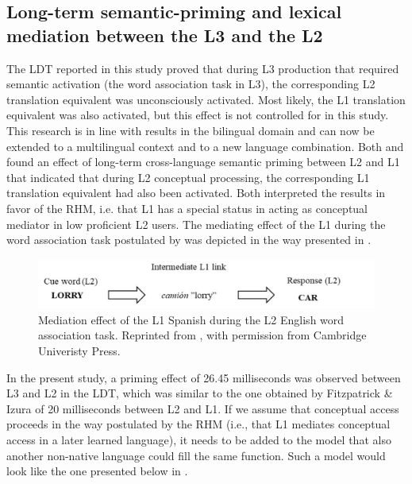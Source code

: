 \documentclass[output=paper,colorlinks,citecolor=brown,nonflat]{langsci/langscibook}
\begin{document}
\subsection{Long-term semantic-priming and lexical mediation between the L3 and the L2}\label{sec:gudmundson:4.2}

The LDT reported in this study proved that during L3 production that required semantic activation (the word association task in L3), the corresponding L2 translation equivalent was unconsciously activated. Most likely, the L1 translation equivalent was also activated, but this effect is not controlled for in this study. This research is in line with results in the bilingual domain and can now be extended to a multilingual context and to a new language combination. Both \citet{FitzpatrickIzura2011} and \citet{LiEtAl2009} found an effect of long-term cross-language semantic priming between L2 and L1 that indicated that during L2 conceptual processing, the corresponding L1 translation equivalent had also been activated. Both interpreted the results in favor of the RHM, i.e. that L1 has a special status in acting as conceptual mediator in low proficient L2 users. The mediating effect of the L1 during the word association task postulated by \citet{FitzpatrickIzura2011} was depicted in the way presented in .

\begin{figure}
    \includegraphics[width=\textwidth]{figures/Gudmundson-fig6.pdf}
    \caption{Mediation effect of the L1 Spanish during the L2 English word association task. Reprinted from \citet{FitzpatrickIzura2011}, with permission from Cambridge Univeristy Press.}
    \label{fig:gudmundson:6}
\end{figure}

In the present study, a priming effect of 26.45 milliseconds was observed between L3 and L2 in the LDT, which was similar to the one obtained by Fitzpatrick \& Izura of 20 milliseconds between L2 and L1. If we assume that conceptual access proceeds in the way postulated by the RHM (i.e., that L1 mediates conceptual access in a later learned language), it needs to be added to the model that also another non-native language could fill the same function. Such a model would look like the one presented below in .
\end{document}
